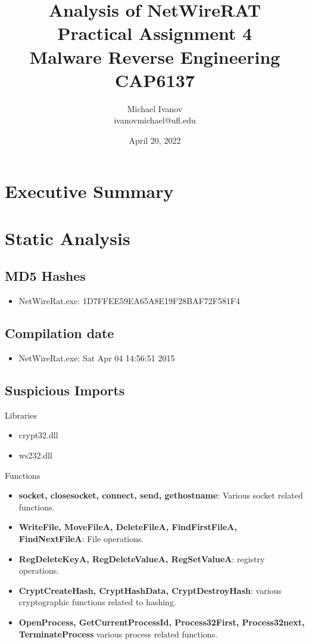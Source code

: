 \documentclass{article}
\title{Analysis of NetWireRAT\\Practical Assignment 4\\Malware Reverse Engineering \\
CAP6137}
\author{Michael Ivanov \\
ivanovmichael@ufl.edu}
\date{April 20, 2022}
\begin{document}
    \maketitle
    \pagebreak
    \section{Executive Summary}
    \pagebreak
    \section{Static Analysis}
    \subsection{MD5 Hashes}
    \begin{itemize}
        \item NetWireRat.exe: 1D7FFEE59EA65A8E19F28BAF72F581F4 \Cite{malwareSample}
    \end{itemize}
    \subsection{Compilation date}
    \begin{itemize}
        \item NetWireRat.exe: Sat Apr 04 14:56:51 2015
    \end{itemize}
    \subsection{Suspicious Imports}
    Libraries
    \begin{itemize}
        \item crypt32.dll
        \item ws2\textunderscore32.dll
    \end{itemize}
    Functions
    \begin{itemize}
        \item \textbf{socket, closesocket, connect, send, gethostname}: Various socket related functions.
        \item \textbf{WriteFile, MoveFileA, DeleteFileA, FindFirstFileA, FindNextFileA}: File operations.
        \item \textbf{RegDeleteKeyA, RegDeleteValueA, RegSetValueA}: registry operations.
        \item \textbf{CryptCreateHash, CryptHashData, CryptDestroyHash}: various cryptographic functions related to hashing.
        \item \textbf{OpenProcess, GetCurrentProcessId, Process32First, Process32next, TerminateProcess} various process related functions.
    \end{itemize}
\end{document}

